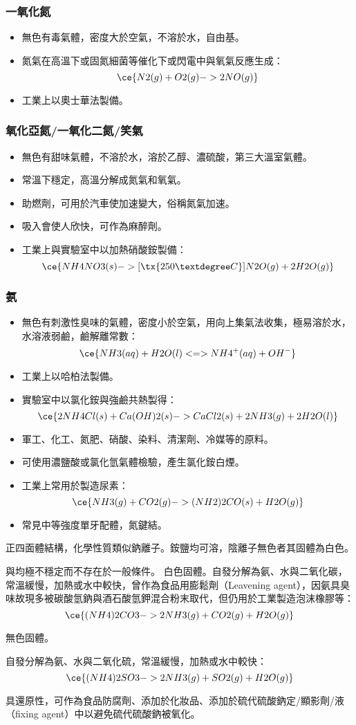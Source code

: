 \documentclass[a4paper,12pt]{report}
\begin{document}
\subsubsection{一氧化氮}
\begin{itemize}
\item 無色有毒氣體，密度大於空氣，不溶於水，自由基。
\item 氮氣在高溫下或固氮細菌等催化下或閃電中與氧氣反應生成：
\[\ce{N2(g) + O2(g) -> 2NO(g)}\]
\item 工業上以奧士華法製備。
\end{itemize}
\subsubsection{氧化亞氮/一氧化二氮/笑氣}
\begin{itemize}
\item 無色有甜味氣體，不溶於水，溶於乙醇、濃硫酸，第三大溫室氣體。
\item 常溫下穩定，高溫分解成氮氣和氧氣。
\item 助燃劑，可用於汽車使加速變大，俗稱氮氣加速。
\item 吸入會使人欣快，可作為麻醉劑。
\item 工業上與實驗室中以加熱硝酸銨製備：
\[\ce{NH4NO3(s) ->[\tx{250°C}] N2O(g) + 2H2O(g)}\]
\end{itemize}
\subsubsection{氨}
\begin{itemize}
\item 無色有刺激性臭味的氣體，密度小於空氣，用向上集氣法收集，極易溶於水，水溶液弱鹼，鹼解離常數：
\[\ce{NH3(aq) + H2O(l) <=> NH4^+(aq) + OH^-}\]
\item 工業上以哈柏法製備。
\item 實驗室中以氯化銨與強鹼共熱製得：
\[\ce{2NH4Cl(s) + Ca(OH)2(s) -> CaCl2(s) + 2NH3(g) + 2H2O(l)}\]
\item 軍工、化工、氮肥、硝酸、染料、清潔劑、冷媒等的原料。
\item 可使用濃鹽酸或氯化氫氣體檢驗，產生氯化銨白煙。
\item 工業上常用於製造尿素：
\[\ce{NH3(g) + CO2(g) -> (NH2)2CO(s) + H2O(g)}\]
\item 常見中等強度單牙配體，氮鍵結。
\end{itemize}
\bit
\item 正四面體結構，化學性質類似鈉離子。銨鹽均可溶，陰離子無色者其固體為白色。
\item {}與均極不穩定而不存在於一般條件。
\eit
{}
白色固體。自發分解為氨、水與二氧化碳，常溫緩慢，加熱或水中較快，曾作為食品用膨鬆劑（Leavening agent），因氨具臭味故現多被碳酸氫鈉與酒石酸氫鉀混合粉末取代，但仍用於工業製造泡沫橡膠等：
\[\ce{(NH4)2CO3 -> 2NH3(g) + CO2(g) + H2O(g)}\]
\bit
\item 無色固體。
\item 自發分解為氨、水與二氧化硫，常溫緩慢，加熱或水中較快：
\[\ce{(NH4)2SO3 -> 2NH3(g) + SO2(g) + H2O(g)}\]
\item 具還原性，可作為食品防腐劑、添加於化妝品、添加於硫代硫酸鈉定/顯影劑/液（fixing agent）中以避免硫代硫酸鈉被氧化。
\eit
\end{document}
